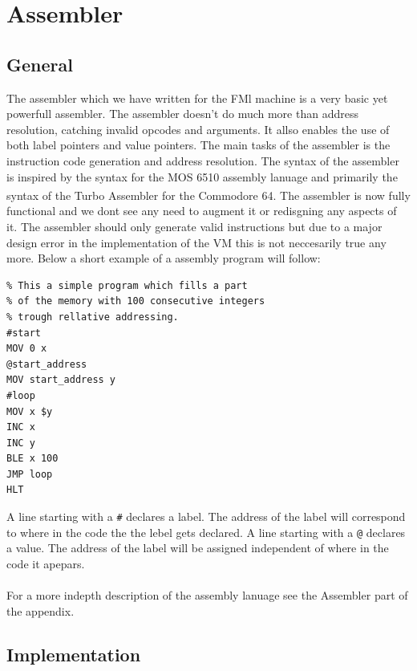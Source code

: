 \documentclass{article}
\newcommand{\V}{\verb}
\begin{document}
\section{Assembler}
\subsection{General}
The assembler which we have written for the FMl machine is a very basic yet
powerfull assembler. The assembler doesn't do much more than address
resolution, catching invalid opcodes and arguments. It allso enables the use of
both label pointers and value pointers. The main tasks of the assembler is the instruction code generation and
address resolution. The syntax of the assembler is inspired by the syntax for
the MOS 6510 assembly lanuage and primarily the syntax of the Turbo
Assembler\textsuperscript{\cite{tasm}} for the Commodore
64\textsuperscript{\cite{c64}}. The assembler is now fully functional and  we
dont see any need to augment it or redisgning any aspects of it. The assembler should only generate valid instructions but due to a major design error in the
implementation of the VM this is not neccesarily true any more. Below a short
example of a assembly program will follow:
\begin{verbatim}
% This a simple program which fills a part
% of the memory with 100 consecutive integers
% trough rellative addressing.
#start
MOV 0 x
@start_address
MOV start_address y
#loop
MOV x $y
INC x
INC y
BLE x 100
JMP loop
HLT
\end{verbatim}
A line starting with a \V+#+ declares a label. The address of the label will
correspond to where in the code the the lebel gets declared.
A line starting with a \V+@+ declares a value. The address of the label will be
assigned independent of where in the code it apepars.
\\
\\
For a more indepth description of the assembly lanuage see the Assembler
part of the appendix.

\subsection{Implementation}
\end{document}
